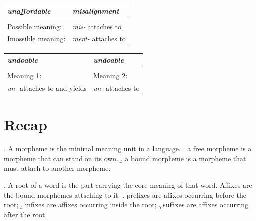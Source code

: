 \documentclass[11pt, oneside]{article}   	%
\begin{document}
\begin{center}
\begin{tabular}{| P{0.4\textwidth} | P{0.4\textwidth} |}\hline
\textit{unaffordable}	&	\textit{misalignment} \\ \hline
						&						   \\[5cm] \hline
Possible meaning: \underline{\hspace{2.5cm}} & {\itshape mis-} attaches to \underline{\hspace{0.5cm}}\\ \hline
Imossible meaning: \underline{\hspace{2.5cm}} & {\itshape ment-} attaches to \underline{\hspace{0.5cm}}\\ \hline
\end{tabular}
\end{center}

\begin{center}
\begin{tabular}{| P{0.4\textwidth} | P{0.4\textwidth} |}\hline
\textit{undoable}	&	\textit{undoable} \\ \hline
		&	\\[5cm] \hline
Meaning 1:	\underline{\hspace{2.5cm}} &	Meaning 2: \underline{\hspace{2.5cm}} \\ \hline
{\itshape un-} attaches to \underline{\hspace{0.5cm}} and yields \underline{\hspace{0.5cm}} & {\itshape un-} attaches to \underline{\hspace{0.5cm}} \\ \hline
\end{tabular}
\end{center}

\section{Recap}

\ex. A morpheme is the minimal meaning unit in a language.
	\a. a free morpheme is a morpheme that can stand on its own.
	\b. a bound morpheme is a morpheme that must attach to another morpheme.

\ex. A root of a word is the part carrying the core meaning of that word. Affixes are the bound morphemes attaching to it.
	\a. prefixes are affixes occurring before the root;
	\b. infixes are affixes occurring inside the root;
	\c. suffixes are affixes occurring after the root.
\end{document}
